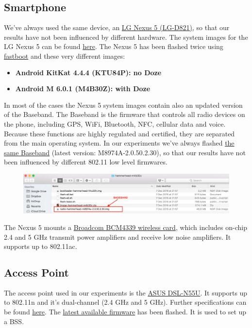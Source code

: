 \documentclass[11pt, a4paper]{article}
\begin{document}
	\subsection{Smartphone}
	We've always used the same device, an \href{https://www.gsmarena.com/lg_nexus_5-5705.php}{LG Nexus 5 (LG-D821)}, so that our results have not been influenced by different hardware. The system images for the LG Nexus 5 can be found \href{https://developers.google.com/android/images#hammerhead}{here}. The Nexus 5 has been flashed twice using \href{https://developers.google.com/android/images#instructions}{fastboot} and these very different images:
	\begin{itemize}
		\item \textbf{Android KitKat 4.4.4 (KTU84P): no Doze}
		\item \textbf{Android M 6.0.1 (M4B30Z): with Doze}
	\end{itemize}

	In most of the cases the Nexus 5 system images contain also an updated version of the Baseband. The Baseband is the firmware that controls all radio devices on the phone, including GPS, WiFi, Bluetooth, NFC, cellular data and voice. Because these functions are highly regulated and certified, they are separated from the main operating system. In our experiments we've always flashed \href{https://www.androidpit.com/how-to-update-nexus-5-bootloader-and-radio}{the same Baseband} (latest version: M8974A-2.0.50.2.30), so that our results have not been influenced by different 802.11 low level firmwares.
	
	\begin{figure}[h]
        \includegraphics[width=\textwidth]{baseband.png}
        \centering
    \end{figure}

	The Nexus 5 mounts a \href{https://www.ifixit.com/Teardown/Nexus+5+Teardown/19016#s53729}{Broadcom BCM4339 wireless card}, which includes on-chip 2.4 and 5 GHz transmit power amplifiers and receive low noise amplifiers. It supports up to 802.11ac.
	
	\subsection{Access Point}
	The access point used in our experiments is the \href{https://www.asus.com/it/Networking/DSLN55U_Annex_A/}{ASUS DSL-N55U}.
	It supports up to 802.11n and it's dual-channel (2.4 GHz and 5 GHz). Further specifications can be found \href{https://www.asus.com/it/Networking/DSLN55U_Annex_A/specifications/}{here}. The \href{https://www.asus.com/it/Networking/DSLN55U_Annex_A/HelpDesk_BIOS/}{latest available firmware} has been flashed. It is used to set up a BSS.
	
\end{document}
